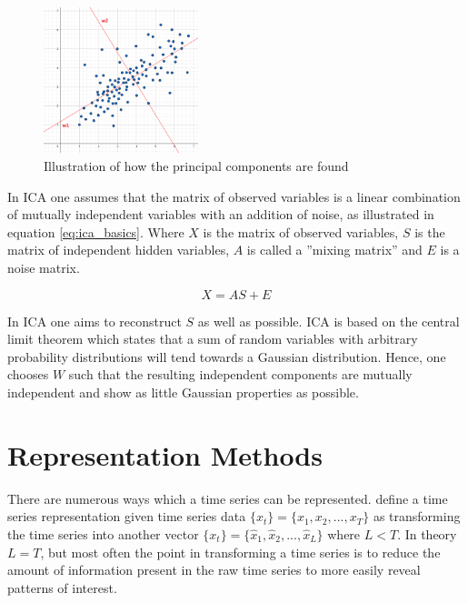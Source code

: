 \begin{figure}
    \begin{center}
    \includegraphics[width=0.4\textwidth]{tsc/pca_illustrated.png}
    \end{center}
    \caption{Illustration of how the principal components are found} 
    \label{fig:pca_illustrated}
\end{figure}

In ICA one assumes that the matrix of observed variables is a linear combination of mutually independent variables with an addition of noise, as illustrated in equation \ref{eq:ica_basics}. 
Where $X$ is the matrix of observed variables, $S$ is the matrix of independent hidden variables, $A$ is called a ''mixing matrix'' and $E$ is a noise matrix.  

\begin{equation}
    X = A S + E
    \label{eq:ica_basics}
\end{equation}

In ICA one aims to reconstruct $S$ as well as possible.
ICA is based on the central limit theorem which states that a sum of random variables with arbitrary probability distributions will tend towards a Gaussian distribution. 
Hence, one chooses $W$ such that the resulting independent components are mutually independent and show as little Gaussian properties as possible.

\section{Representation Methods}
There are numerous ways which a time series can be represented. 
\textcite{tsc_rev} define a time series representation given time series data $\{x_t\} = \{x_1, x_2, ... ,x_T\}$ as transforming the time series into another vector $\{x_t\} = \{\hat{x}_1, \hat{x}_2, ... ,\hat{x}_L\}$ where $L < T$. 
In theory $L=T$, but most often the point in transforming a time series is to reduce the amount of information present in the raw time series to more easily reveal patterns of interest. \bigskip

